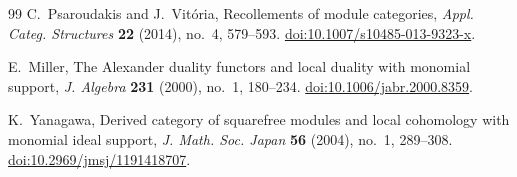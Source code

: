 \documentclass[12pt,reqno]{amsart}
\theoremstyle{definition}
\theoremstyle{remark}
\begin{document}
\begin{thebibliography}{99}
C.~Psaroudakis and J.~Vit\'oria,
\newblock Recollements of module categories,
\newblock \emph{Appl. Categ. Structures} \textbf{22} (2014), no.~4, 579--593.
\newblock \href{https://doi.org/10.1007/s10485-013-9323-x}{doi:10.1007/s10485-013-9323-x}.


E.~Miller,
\newblock The Alexander duality functors and local duality with monomial support,
\newblock \emph{J. Algebra} \textbf{231} (2000), no.~1, 180--234.
\newblock \href{https://doi.org/10.1006/jabr.2000.8359}{doi:10.1006/jabr.2000.8359}.

K.~Yanagawa,
\newblock Derived category of squarefree modules and local cohomology with monomial ideal support,
\newblock \emph{J. Math. Soc. Japan} \textbf{56} (2004), no.~1, 289--308.
\newblock \href{https://doi.org/10.2969/jmsj/1191418707}{doi:10.2969/jmsj/1191418707}.

\end{thebibliography}
\end{document}
